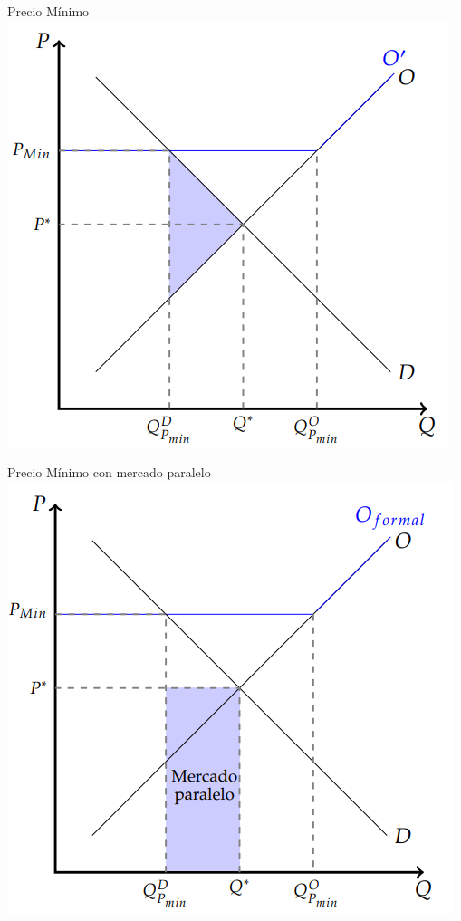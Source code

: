 \documentclass{beamer}
\begin{document}
\begin{frame}{Precio Mínimo}
    \centering
    \includegraphics[scale=0.7]{../Figures/C24.6.png}
\end{frame}

\begin{frame}{Precio Mínimo con mercado paralelo}
    \centering
    \includegraphics[scale=0.7]{../Figures/C24.7.png}
\end{frame}
\end{document}
